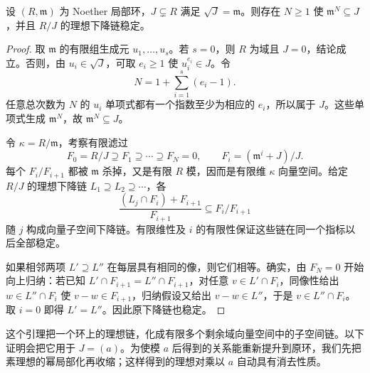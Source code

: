 \begin{lemma}\label{g5:lem:local-radical-artinian-quotient}
	设 \((R,\mathfrak m)\) 为 Noether 局部环，\(J\subsetneq R\) 满足 \(\sqrt J=\mathfrak m\)。则存在 \(N\geq1\) 使 \(\mathfrak m^N\subseteq J\)，并且 \(R/J\) 的理想下降链稳定。
\end{lemma}
\begin{proof}
	取 \(\mathfrak m\) 的有限组生成元 \(u_1,\ldots,u_s\)。若 \(s=0\)，则 \(R\) 为域且 \(J=0\)，结论成立。否则，由 \(u_i\in\sqrt J\)，可取 \(e_i\geq1\) 使 \(u_i^{e_i}\in J\)。令
	\[
	N=1+\sum_{i=1}^s(e_i-1).
	\]
	任意总次数为 \(N\) 的 \(u_i\) 单项式都有一个指数至少为相应的 \(e_i\)，所以属于 \(J\)。这些单项式生成 \(\mathfrak m^N\)，故 \(\mathfrak m^N\subseteq J\)。

	令 \(\kappa=R/\mathfrak m\)，考察有限滤过
	\[
	F_0=R/J\supseteq F_1\supseteq\cdots\supseteq F_N=0,
	\qquad F_i=(\mathfrak m^i+J)/J.
	\]
	每个 \(F_i/F_{i+1}\) 都被 \(\mathfrak m\) 杀掉，又是有限 \(R\) 模，因而是有限维 \(\kappa\) 向量空间。给定 \(R/J\) 的理想下降链 \(L_1\supseteq L_2\supseteq\cdots\)，各
	\[
	\frac{(L_j\cap F_i)+F_{i+1}}{F_{i+1}}
	\subseteq F_i/F_{i+1}
	\]
	随 \(j\) 构成向量子空间下降链。有限维性及 \(i\) 的有限性保证这些链在同一个指标以后全部稳定。

	如果相邻两项 \(L'\supseteq L''\) 在每层具有相同的像，则它们相等。确实，由 \(F_N=0\) 开始向上归纳：若已知 \(L'\cap F_{i+1}=L''\cap F_{i+1}\)，对任意 \(v\in L'\cap F_i\)，同像性给出 \(w\in L''\cap F_i\) 使 \(v-w\in F_{i+1}\)，归纳假设又给出 \(v-w\in L''\)，于是 \(v\in L''\cap F_i\)。取 \(i=0\) 即得 \(L'=L''\)。因此原下降链也稳定。
\end{proof}

这个引理把一个环上的理想链，化成有限多个剩余域向量空间中的子空间链。以下证明会把它用于 \(J=(a)\)。为使模 \(a\) 后得到的关系能重新提升到原环，我们先把素理想的幂局部化再收缩；这样得到的理想对乘以 \(a\) 自动具有消去性质。

